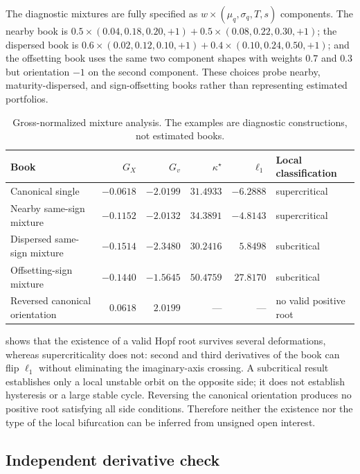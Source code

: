 \documentclass[11pt]{article}
\begin{document}
The diagnostic mixtures are fully specified as
$w\times(\mu_q,\sigma_q,T,s)$ components.  The nearby book is
$0.5\times(0.04,0.18,0.20,+1)+0.5\times(0.08,0.22,0.30,+1)$; the dispersed book is
$0.6\times(0.02,0.12,0.10,+1)+0.4\times(0.10,0.24,0.50,+1)$; and the offsetting book uses
the same two component shapes with weights $0.7$ and $0.3$ but orientation $-1$ on the
second component.  These choices probe nearby, maturity-dispersed, and sign-offsetting
books rather than representing estimated portfolios.

\begin{table}[!htbp]
\centering
\small
\begin{tabular}{lrrrrl}
\toprule
Book & $G_X$ & $G_v$ & $\kappa^\star$ & $\ell_1$ & Local classification\\
\midrule
Canonical single & $-0.0618$ & $-2.0199$ & $31.4933$ & $-6.2888$ & supercritical\\
Nearby same-sign mixture & $-0.1152$ & $-2.0132$ & $34.3891$ & $-4.8143$ & supercritical\\
Dispersed same-sign mixture & $-0.1514$ & $-2.3480$ & $30.2416$ & $5.8498$ & subcritical\\
Offsetting-sign mixture & $-0.1440$ & $-1.5645$ & $50.4759$ & $27.8170$ & subcritical\\
Reversed canonical orientation & $0.0618$ & $2.0199$ & --- & --- & no valid positive root\\
\bottomrule
\end{tabular}
\caption{Gross-normalized mixture analysis.  The examples are diagnostic constructions, not
estimated books.}
\label{tab:mixtures}
\end{table}

 shows that the existence of a valid Hopf root survives several
deformations, whereas supercriticality does not: second and
third derivatives of the book can flip $\ell_1$ without eliminating the imaginary-axis
crossing.  A subcritical result establishes only a local unstable orbit on the opposite
side; it does not establish hysteresis or a large stable cycle.  Reversing the canonical
orientation produces no positive root satisfying all side conditions.  Therefore neither
the existence nor the type of the local bifurcation can be inferred from unsigned open
interest.

\subsection{Independent derivative check}
\end{document}
